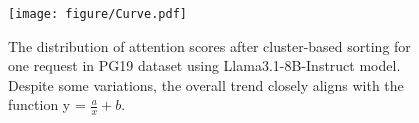 \begin{figure}[t]
    \centering
    \texttt{[image: figure/Curve.pdf]} 
    \caption{The distribution of attention scores after cluster-based sorting for one request in PG19 dataset using Llama3.1-8B-Instruct model. Despite some variations, the overall trend closely aligns with the function y = $\frac{a}{x}+b$.}
    \label{fig:distribution_curve}
\end{figure}
\vspace{-0.1in}

